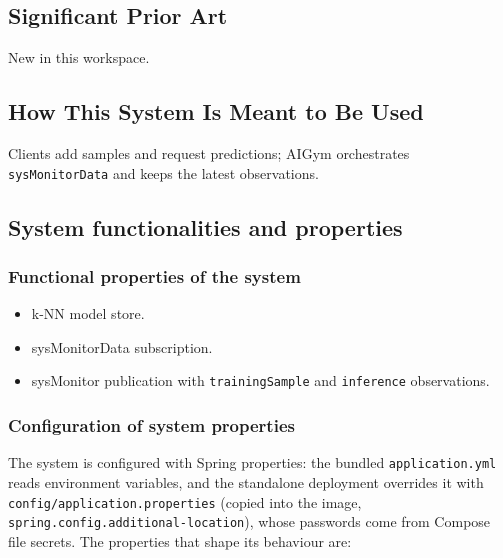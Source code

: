\documentclass[a4paper]{arrowhead}
\begin{document}
\newpage

\subsection{Significant Prior Art}
\label{sec:prior_art}

New in this workspace.

\subsection{How This System Is Meant to Be Used}
\label{sec:use}

Clients add samples and request predictions; AIGym orchestrates \texttt{sysMonitorData} and keeps the latest observations.

\subsection{System functionalities and properties}
\label{sec:properties}

\subsubsection{Functional properties of the system}

\begin{itemize}
  \item k-NN model store.
  \item sysMonitorData subscription.
  \item sysMonitor publication with \texttt{trainingSample} and \texttt{inference} observations.
\end{itemize}

\subsubsection{Configuration of system properties}

The system is configured with Spring properties: the bundled \texttt{application.\allowbreak{}yml} reads environment variables, and the standalone deployment overrides it with \texttt{config/\allowbreak{}application.\allowbreak{}properties} (copied into the image, \texttt{spring.\allowbreak{}config.\allowbreak{}additional-\allowbreak{}location}), whose passwords come from Compose file secrets. The properties that shape its behaviour are:
\end{document}
